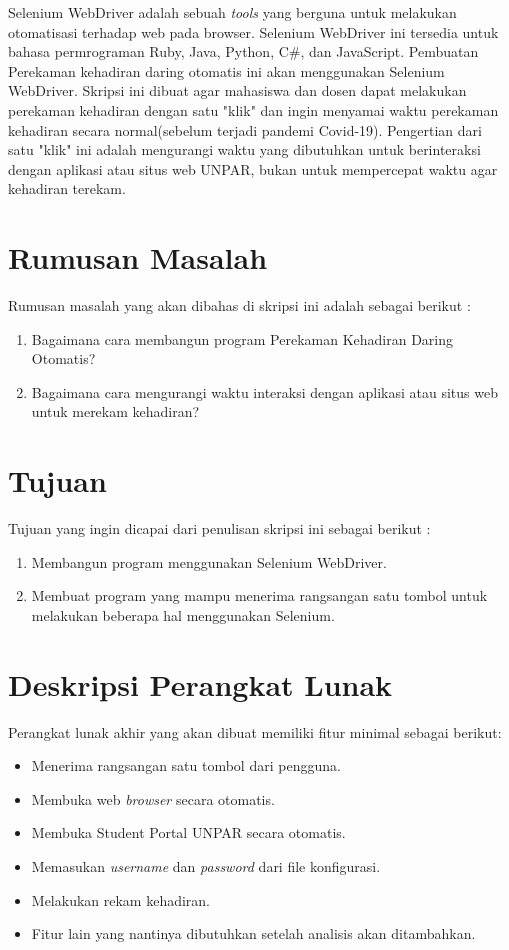 \documentclass[a4paper,twoside]{article}
\begin{document}
 Selenium WebDriver adalah sebuah \textit{tools} yang berguna untuk melakukan otomatisasi terhadap web pada browser. Selenium WebDriver ini tersedia untuk bahasa permrograman Ruby, Java, Python, C\#, dan JavaScript. Pembuatan Perekaman kehadiran daring otomatis ini akan menggunakan Selenium WebDriver. Skripsi ini dibuat agar mahasiswa dan dosen dapat melakukan perekaman kehadiran dengan satu "klik" dan ingin menyamai waktu perekaman kehadiran secara normal(sebelum terjadi pandemi Covid-19). Pengertian dari satu "klik" ini adalah mengurangi waktu yang dibutuhkan untuk berinteraksi dengan aplikasi atau situs web UNPAR, bukan untuk mempercepat waktu agar kehadiran terekam. 

\section{Rumusan Masalah}
Rumusan masalah yang akan dibahas di skripsi ini adalah sebagai berikut :
\begin{enumerate}
	\item Bagaimana cara membangun program Perekaman Kehadiran Daring Otomatis?
	\item Bagaimana cara mengurangi waktu interaksi dengan aplikasi atau situs web untuk merekam kehadiran?
	
\end{enumerate}

\section{Tujuan}
Tujuan yang ingin dicapai dari penulisan skripsi ini sebagai berikut :
\begin{enumerate}
	\item Membangun program menggunakan Selenium WebDriver.
	\item Membuat program yang mampu menerima rangsangan satu tombol untuk melakukan beberapa hal menggunakan Selenium.
	
\end{enumerate}



\section{Deskripsi Perangkat Lunak}
Perangkat lunak akhir yang akan dibuat memiliki fitur minimal sebagai berikut:
\begin{itemize}
	\item Menerima rangsangan satu tombol dari pengguna.
	\item Membuka web \textit{browser} secara otomatis.
	\item Membuka Student Portal UNPAR secara otomatis.
	\item Memasukan \textit{username} dan \textit{password} dari file konfigurasi.
	\item Melakukan rekam kehadiran.
	\item Fitur lain yang nantinya dibutuhkan setelah analisis akan ditambahkan. 
\end{itemize}
\end{document}
